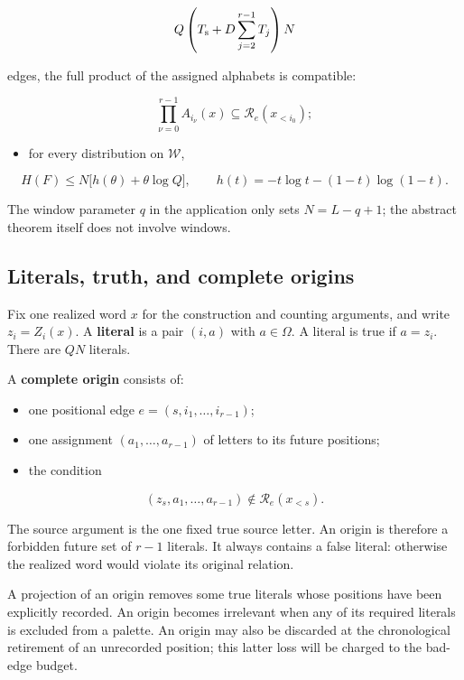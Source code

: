 \[
Q\left(T_{\rm s}+D\sum_{j=2}^{r-1}T_j\right)N
\]

edges, the full product of the assigned alphabets is compatible:

\[
\prod_{\nu=0}^{r-1}A_{i_\nu}(x)\subseteq\mathcal R_e(x_{<i_0});
\]

\begin{itemize}
\tightlist
\item
  for every distribution on \(\mathcal W\),
\end{itemize}

\[
H(F)\le N\bigl[h(\theta)+\theta\log Q\bigr],
\qquad
h(t)=-t\log t-(1-t)\log(1-t).
\]

The window parameter \(q\) in the application only sets \(N=L-q+1\); the abstract theorem itself does not involve windows.

\subsection{Literals, truth, and complete origins}\label{literals-truth-and-complete-origins}

Fix one realized word \(x\) for the construction and counting arguments, and write \(z_i=Z_i(x)\). A \textbf{literal} is a pair \((i,a)\) with \(a\in\Omega\). A literal is true if \(a=z_i\). There are \(QN\) literals.

A \textbf{complete origin} consists of:

\begin{itemize}
\tightlist
\item
  one positional edge \(e=(s,i_1,\ldots,i_{r-1})\);
\item
  one assignment \((a_1,\ldots,a_{r-1})\) of letters to its future positions;
\item
  the condition
\end{itemize}

\[
(z_s,a_1,\ldots,a_{r-1})\notin\mathcal R_e(x_{<s}).
\]

The source argument is the one fixed true source letter. An origin is therefore a forbidden future set of \(r-1\) literals. It always contains a false literal: otherwise the realized word would violate its original relation.

A projection of an origin removes some true literals whose positions have been explicitly recorded. An origin becomes irrelevant when any of its required literals is excluded from a palette. An origin may also be discarded at the chronological retirement of an unrecorded position; this latter loss will be charged to the bad-edge budget.

